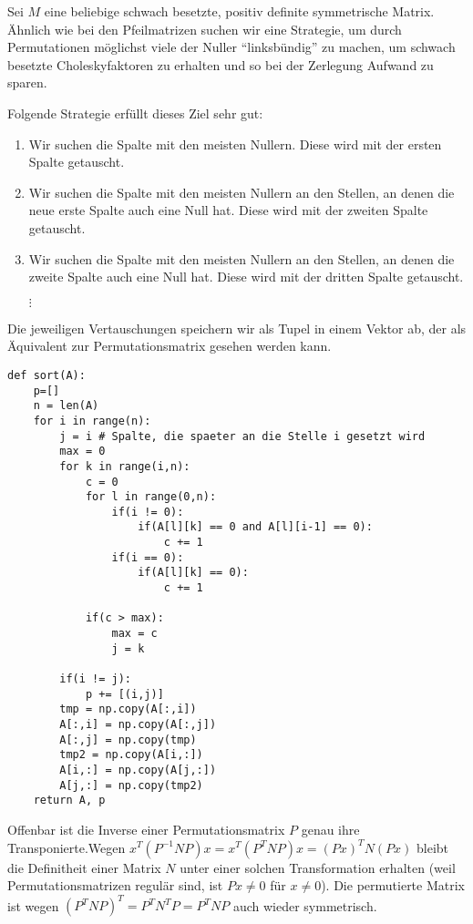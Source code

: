 \documentclass{article}
\begin{document}
Sei $M$ eine beliebige schwach besetzte, positiv definite symmetrische Matrix. Ähnlich wie bei den Pfeilmatrizen suchen wir eine Strategie, um durch Permutationen möglichst viele der Nuller "`linksbündig"' zu machen, um schwach besetzte Choleskyfaktoren zu erhalten und so bei der Zerlegung Aufwand zu sparen.

Folgende Strategie erfüllt dieses Ziel sehr gut:

\begin{enumerate}
    \item Wir suchen die Spalte mit den meisten Nullern. Diese wird mit der ersten Spalte getauscht.
    \item Wir suchen die Spalte mit den meisten Nullern an den Stellen, an denen die neue erste Spalte auch eine Null hat. Diese wird mit der zweiten Spalte getauscht.
    \item Wir suchen die Spalte mit den meisten Nullern an den Stellen, an denen die zweite Spalte auch eine Null hat. Diese wird mit der dritten Spalte getauscht.
    
    $\vdots$
\end{enumerate}

Die jeweiligen Vertauschungen speichern wir als Tupel in einem Vektor ab, der als Äquivalent zur Permutationsmatrix gesehen werden kann.

\lstset{language=Python}
\lstset{frame=lines}
\lstset{basicstyle=\footnotesize}
\begin{lstlisting}
def sort(A):
    p=[]
    n = len(A)
    for i in range(n):
        j = i # Spalte, die spaeter an die Stelle i gesetzt wird
        max = 0
        for k in range(i,n):
            c = 0
            for l in range(0,n):
                if(i != 0):
                    if(A[l][k] == 0 and A[l][i-1] == 0):
                        c += 1
                if(i == 0):
                    if(A[l][k] == 0):
                        c += 1

            if(c > max):
                max = c
                j = k

        if(i != j):
            p += [(i,j)]
        tmp = np.copy(A[:,i])
        A[:,i] = np.copy(A[:,j])
        A[:,j] = np.copy(tmp)
        tmp2 = np.copy(A[i,:])
        A[i,:] = np.copy(A[j,:])
        A[j,:] = np.copy(tmp2)
    return A, p
\end{lstlisting}

Offenbar ist die Inverse einer Permutationsmatrix $P$ genau ihre Transponierte.\newline Wegen $x^T (P^{-1}NP) x = x^T (P^TNP) x = (Px)^T N (Px)$ bleibt die Definitheit einer Matrix $N$ unter einer solchen Transformation erhalten (weil Permutationsmatrizen regulär sind, ist $Px \neq 0$ für $x \neq 0$).
Die permutierte Matrix ist wegen $(P^TNP)^T = P^TN^TP = P^TNP$ auch wieder symmetrisch.
\end{document}
